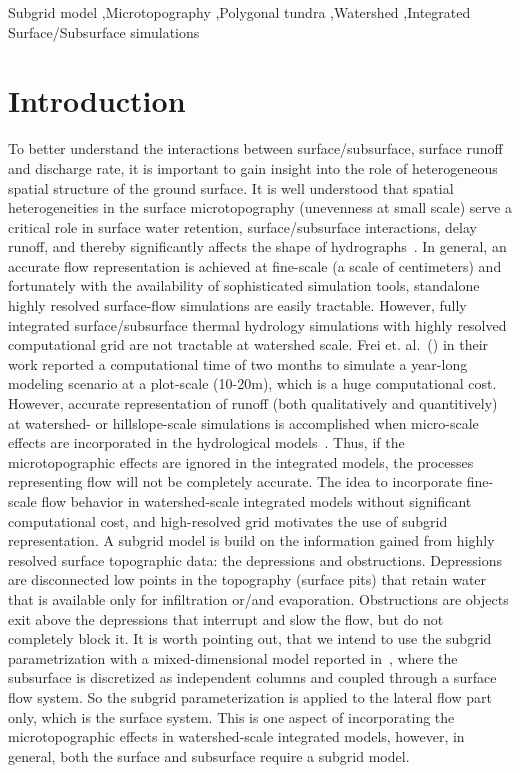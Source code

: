 \documentclass[review,11pt]{elsarticle}
\begin{document}
\begin{frontmatter}
\begin{keyword}
Subgrid model \sep Microtopography  \sep  Polygonal tundra \sep  Watershed \sep Integrated Surface/Subsurface simulations
\end{keyword}


\end{frontmatter}

\linenumbers

\FloatBarrier
\section{Introduction}\label{introduction}
To better understand the interactions between surface/subsurface, surface runoff and discharge rate, it is important to gain insight into the role of
heterogeneous spatial structure of the ground surface.
It is well understood that spatial heterogeneities in the surface microtopography (unevenness at small scale) serve a critical role in surface water retention, surface/subsurface interactions, delay runoff, and thereby significantly affects the shape of hydrographs~\cite{toth1962theory,dunne1991effects,holden2005peatland, kvaerner2008generation, huang2009influences, andresen2015disappearing}. In general, an accurate flow representation is achieved at fine-scale (a scale of centimeters) and fortunately with the availability of sophisticated simulation tools, standalone highly resolved surface-flow simulations are easily tractable. However, fully integrated surface/subsurface thermal hydrology simulations with highly resolved computational grid are not tractable at watershed scale. Frei et. al.~(\citeyear{frei2010effects}) in their work reported a computational time of two months to simulate a year-long modeling scenario at a plot-scale (10-20m), which is a huge computational cost. However, accurate representation of runoff (both qualitatively and quantitively) at watershed- or hillslope-scale simulations is accomplished when micro-scale effects are incorporated in the hydrological models~\cite{bronstert1997modelling,nakayama2006simulation}. Thus, if the microtopographic effects are ignored in the integrated models, the processes representing flow will not be completely accurate. 
The idea to incorporate fine-scale flow behavior in watershed-scale integrated models without significant computational cost, and high-resolved grid motivates the use of subgrid representation. A subgrid model is build on the information gained from highly resolved surface topographic data: the depressions and obstructions. Depressions are disconnected low points in the topography (surface pits) that retain water that is available only for infiltration or/and evaporation. Obstructions are objects exit above the depressions that interrupt and slow the flow, but do not completely block it. It is worth pointing out, that we intend to use the subgrid parametrization with a mixed-dimensional model reported in~\cite{jan2017}, where the subsurface is discretized as independent columns and coupled through a surface flow system. So the subgrid parameterization is applied to the lateral flow part only, which is the surface system. This is one aspect of incorporating the microtopographic effects in watershed-scale integrated models, however, in general, both the surface and subsurface require a subgrid model. 
\end{document}
